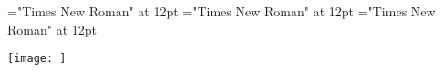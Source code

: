 \documentclass{article}
\begin{document}
 
\thispagestyle{empty} 
\font\picturepictureRightentrydicBody="Times New Roman" at 12pt
\font\pictureRightentrydicBody="Times New Roman" at 12pt
\font\entrydicBody="Times New Roman" at 12pt


\begin{wrapfigure}
\begin{center}
{\texttt{[image: ]}} 
\caption{}
\end{center}
\end{wrapfigure}
\end{document}
